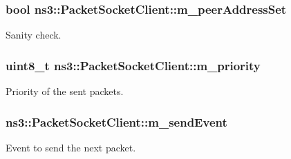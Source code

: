 \subsubsection[{\texorpdfstring{m\+\_\+peer\+Address\+Set}{m_peerAddressSet}}]{\setlength{\rightskip}{0pt plus 5cm}bool ns3\+::\+Packet\+Socket\+Client\+::m\+\_\+peer\+Address\+Set\hspace{0.3cm}{\ttfamily [private]}}\hypertarget{classns3_1_1PacketSocketClient_ad6674274402bc6506d8fc5c8b0210f92}{}\label{classns3_1_1PacketSocketClient_ad6674274402bc6506d8fc5c8b0210f92}


Sanity check. 

\subsubsection[{\texorpdfstring{m\+\_\+priority}{m_priority}}]{\setlength{\rightskip}{0pt plus 5cm}uint8\+\_\+t ns3\+::\+Packet\+Socket\+Client\+::m\+\_\+priority\hspace{0.3cm}{\ttfamily [private]}}\hypertarget{classns3_1_1PacketSocketClient_aed618e34c7c3b8cedc831b14c6d4129f}{}\label{classns3_1_1PacketSocketClient_aed618e34c7c3b8cedc831b14c6d4129f}


Priority of the sent packets. 

\subsubsection[{\texorpdfstring{m\+\_\+send\+Event}{m_sendEvent}}]{ ns3\+::\+Packet\+Socket\+Client\+::m\+\_\+send\+Event\hspace{0.3cm}{\ttfamily [private]}}\hypertarget{classns3_1_1PacketSocketClient_a6f213865e8780152a1cc67d41be69923}{}\label{classns3_1_1PacketSocketClient_a6f213865e8780152a1cc67d41be69923}


Event to send the next packet. 


